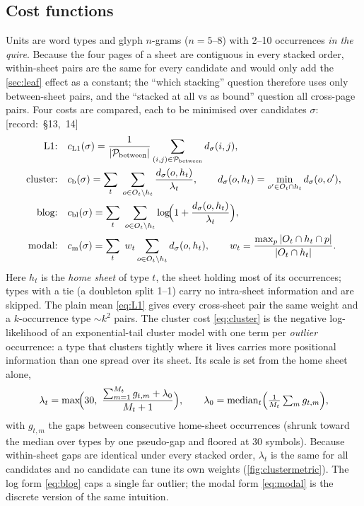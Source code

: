 \documentclass[11pt,a4paper]{article}
\newcommand{\src}[1]{{\footnotesize\color{muted}\sffamily\mbox{[record: \S#1]}}}
\begin{document}
\subsection{Cost functions}
\label{sec:costs}

Units are word types and glyph $n$-grams ($n=5$--8) with 2--10 occurrences \emph{in the quire}. Because the four pages of a sheet are contiguous in every stacked order, within-sheet pairs are the same for every candidate and would only add the \cref{sec:leaf} effect as a constant; the ``which stacking'' question therefore uses only between-sheet pairs, and the ``stacked at all vs as bound'' question all cross-page pairs. Four costs are compared, each to be minimised over candidates $\sigma$: \src{13, 14}
\begin{align}
\text{L1:}\quad & c_{\mathrm{L1}}(\sigma)=\frac{1}{|\mathcal{P}_{\text{between}}|}\sum_{(i,j)\in\mathcal{P}_{\text{between}}} d_\sigma(i,j),
\label{eq:L1}\\
\text{cluster:}\quad & c_{\mathrm{b}}(\sigma)=\sum_{t}\ \sum_{o\in O_t\setminus h_t}\frac{d_\sigma(o,h_t)}{\lambda_t},\qquad d_\sigma(o,h_t)=\min_{o'\in O_t\cap h_t}d_\sigma(o,o'),
\label{eq:cluster}\\
\text{blog:}\quad & c_{\mathrm{bl}}(\sigma)=\sum_{t}\ \sum_{o\in O_t\setminus h_t}\log\!\Bigl(1+\frac{d_\sigma(o,h_t)}{\lambda_t}\Bigr),
\label{eq:blog}\\
\text{modal:}\quad & c_{\mathrm{m}}(\sigma)=\sum_{t}\ w_t\sum_{o\in O_t\setminus h_t} d_\sigma(o,h_t),\qquad w_t=\frac{\max_p|O_t\cap h_t\cap p|}{|O_t\cap h_t|}.
\label{eq:modal}
\end{align}
Here $h_t$ is the \emph{home sheet} of type $t$, the sheet holding most of its occurrences; types with a tie (a doubleton split 1--1) carry no intra-sheet information and are skipped. The plain mean \cref{eq:L1} gives every cross-sheet pair the same weight and a $k$-occurrence type $\sim k^2$ pairs. The cluster cost \cref{eq:cluster} is the negative log-likelihood of an exponential-tail cluster model with one term per \emph{outlier} occurrence: a type that clusters tightly where it lives carries more positional information than one spread over its sheet. Its scale is set from the home sheet alone,
\begin{equation}
\lambda_t=\max\!\Bigl(30,\ \frac{\sum_{m=1}^{M_t} g_{t,m}+\lambda_0}{M_t+1}\Bigr),\qquad
\lambda_0=\operatorname{median}_t\Bigl(\tfrac{1}{M_t}\textstyle\sum_m g_{t,m}\Bigr),
\label{eq:lambda}
\end{equation}
with $g_{t,m}$ the gaps between consecutive home-sheet occurrences (shrunk toward the median over types by one pseudo-gap and floored at 30 symbols). Because within-sheet gaps are identical under every stacked order, $\lambda_t$ is the same for all candidates and no candidate can tune its own weights (\cref{fig:clustermetric}). The log form \cref{eq:blog} caps a single far outlier; the modal form \cref{eq:modal} is the discrete version of the same intuition.
\end{document}
